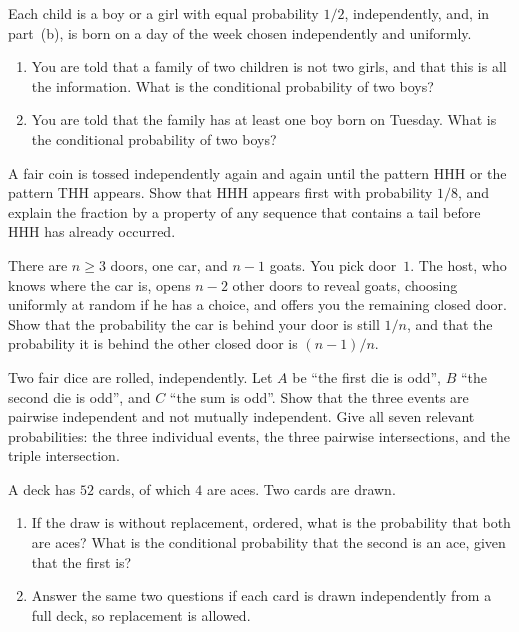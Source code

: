 \begin{exercise}[$\star$]\label{ex:twochildren}
Each child is a boy or a girl with equal probability $1/2$, independently, and, in part~(b), is born on a day of the week chosen independently and uniformly.
\begin{enumerate}[label=(\alph*)]
\item You are told that a family of two children is not two girls, and that this is all the information. What is the conditional probability of two boys?
\item You are told that the family has at least one boy born on Tuesday. What is the conditional probability of two boys?
\end{enumerate}
\end{exercise}

\begin{exercise}[$\star\star$]\label{ex:penney}
A fair coin is tossed independently again and again until the pattern HHH or the pattern THH appears. Show that HHH appears first with probability $1/8$, and explain the fraction by a property of any sequence that contains a tail before HHH has already occurred.
\end{exercise}

\begin{exercise}[$\star\star$]\label{ex:montyn}
There are $n\ge3$ doors, one car, and $n-1$ goats. You pick door~$1$. The host, who knows where the car is, opens $n-2$ other doors to reveal goats, choosing uniformly at random if he has a choice, and offers you the remaining closed door. Show that the probability the car is behind your door is still $1/n$, and that the probability it is behind the other closed door is $(n-1)/n$.
\end{exercise}

\begin{exercise}[$\star\star$]\label{ex:pairwise}
Two fair dice are rolled, independently. Let $A$ be ``the first die is odd'', $B$ ``the second die is odd'', and $C$ ``the sum is odd''. Show that the three events are pairwise independent and not mutually independent. Give all seven relevant probabilities: the three individual events, the three pairwise intersections, and the triple intersection.
\end{exercise}

\begin{exercise}[$\star$]\label{ex:aces}
A deck has $52$ cards, of which $4$ are aces. Two cards are drawn.
\begin{enumerate}[label=(\alph*)]
\item If the draw is without replacement, ordered, what is the probability that both are aces? What is the conditional probability that the second is an ace, given that the first is?
\item Answer the same two questions if each card is drawn independently from a full deck, so replacement is allowed.
\end{enumerate}
\end{exercise}

